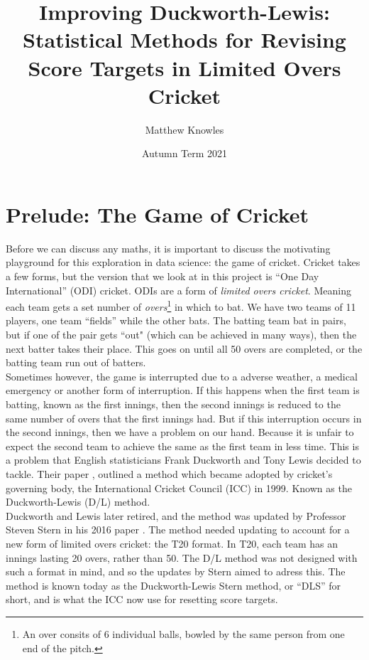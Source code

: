 \documentclass[11pt]{amsart}
\title[Improving DLS]{Improving Duckworth-Lewis: Statistical Methods for Revising Score Targets in Limited Overs Cricket}
\author{Matthew Knowles}
\date{Autumn Term 2021}
\begin{document}
\maketitle

\section{Prelude: The Game of Cricket}
Before we can discuss any maths, it is important to discuss the motivating playground for this exploration in data science: the game of cricket.
Cricket takes a few forms, but the version that we look at in this project is ``One Day International'' (ODI) cricket. ODIs are a form of 
\textit{limited overs cricket}. Meaning each team gets a set number of \textit{overs}\footnote{An over consits of 6 individual balls, bowled by the same person from one end of the pitch.} in which to bat. We have two teams of 11 players, one team ``fields''
while the other bats. The batting team bat in pairs, but if one of the pair gets ``out" (which can be achieved in many ways), then the next batter takes their place.
This goes on until all 50 overs are completed, or the batting team run out of batters. \\

Sometimes however, the game is interrupted due to a adverse weather, a medical emergency or another form of interruption. If this happens when the first team is batting,
known as the first innings, then the second innings is reduced to the same number of overs that the first innings had. But if this interruption occurs in the second 
innings, then we have a problem on our hand. Because it is unfair to expect the second team to achieve the same as the first team in less time. 
This is a problem that English statisticians Frank Duckworth and Tony Lewis decided to tackle. Their paper \cite{duckworth}, outlined a method which became 
adopted by cricket's governing body, the International Cricket Council (ICC) in 1999. Known as the Duckworth-Lewis (D/L) method. \\

Duckworth and Lewis later retired, and the method was updated by Professor Steven Stern in his 2016 paper \cite{stern}. The method needed
updating to account for a new form of limited overs cricket: the T20 format. In T20, each team has an innings lasting 20 overs, rather than 50. The D/L method
was not designed with such a format in mind, and so the updates by Stern aimed to adress this. The method is known today as the Duckworth-Lewis Stern method, or ``DLS'' for short, and is 
what the ICC now use for resetting score targets. 
\end{document}
